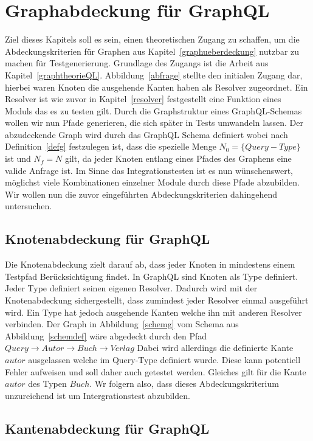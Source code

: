 \chapter{Graphabdeckung für GraphQL}
\label{gqlcov}

Ziel dieses Kapitels soll es sein, einen theoretischen Zugang zu schaffen, um die Abdeckungskriterien für Graphen aus Kapitel~\ref{graphueberdeckung} nutzbar zu machen für Testgenerierung.
Grundlage des Zugangs ist die Arbeit aus Kapitel~\ref{graphtheorieQL}.
Abbildung~\ref{abfrage} stellte den initialen Zugang dar, hierbei waren Knoten die ausgehende Kanten haben als Resolver zugeordnet.
Ein Resolver ist wie zuvor in Kapitel~\ref{resolver} festgestellt eine Funktion eines Moduls das es zu testen gilt.
Durch die Graphstruktur eines GraphQL-Schemas wollen wir nun Pfade generieren, die sich später in Tests umwandeln lassen.
Der abzudeckende Graph wird durch das GraphQL Schema definiert wobei nach Definition~\ref{defg} festzulegen ist,
dass die spezielle Menge $N_{0} = \{ Query-Type \}$ ist und $N_{f} = N$ gilt, da jeder Knoten entlang eines Pfades des Graphens eine valide Anfrage ist.
Im Sinne das Integrationstesten ist es nun wünschenswert, möglichst viele Kombinationen einzelner Module durch diese Pfade abzubilden.
Wir wollen nun die zuvor eingeführten Abdeckungskriterien dahingehend untersuchen.

\section{Knotenabdeckung für GraphQL}

Die Knotenabdeckung zielt darauf ab, dass jeder Knoten in mindestens einem Testpfad Berücksichtigung findet.
In GraphQL sind Knoten als Type definiert.
Jeder Type definiert seinen eigenen Resolver.
Dadurch wird mit der Knotenabdeckung sichergestellt, dass zumindest jeder Resolver einmal ausgeführt wird.
Ein Type hat jedoch ausgehende Kanten welche ihn mit anderen Resolver verbinden.
Der Graph in Abbildung~\ref{schemg} vom Schema aus Abbildung~\ref{schemdef} wäre abgedeckt durch den Pfad
$ Query \rightarrow Autor \rightarrow Buch \rightarrow Verlag $
Dabei wird allerdings die definierte Kante $autor$ ausgelassen welche im Query-Type definiert wurde.
Diese kann potentiell Fehler aufweisen und soll daher auch getestet werden.
Gleiches gilt für die Kante $autor$ des Typen $Buch$.
Wr folgern also, dass dieses Abdeckungskriterium unzureichend ist um Intergrationstest abzubilden.

\section{Kantenabdeckung für GraphQL}

